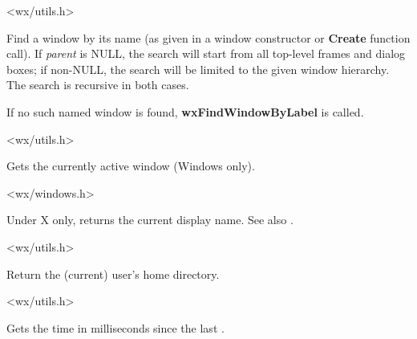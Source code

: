 
<wx/utils.h>

\label{wxfindwindowbyname}


Find a window by its name (as given in a window constructor or {\bf Create} function call).
If {\it parent} is NULL, the search will start from all top-level
frames and dialog boxes; if non-NULL, the search will be limited to the given window hierarchy.
The search is recursive in both cases.

If no such named window is found, {\bf wxFindWindowByLabel} is called.


<wx/utils.h>

\label{wxgetactivewindow}


Gets the currently active window (Windows only).


<wx/windows.h>

\label{wxgetdisplayname}


Under X only, returns the current display name. See also .


<wx/utils.h>

\label{wxgethomedir}


Return the (current) user's home directory.




<wx/utils.h>

\label{wxgetelapsedtime}


Gets the time in milliseconds since the last .

